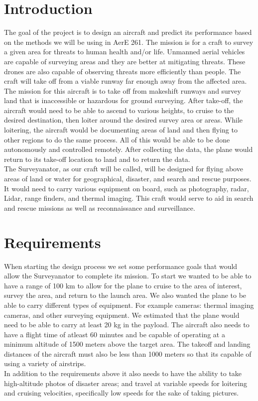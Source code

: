 \documentclass[12pt,A4paper]{article}
\begin{document}
	\section{Introduction}
	\hspace{.15 in} The goal of the project is to design an aircraft and predict its performance based on the methods we will be using in AerE 261. The mission is for a craft to survey a given area for threats to human health and/or life. Unmanned aerial vehicles are capable of surveying areas and they are better at mitigating threats. These drones are also capable of observing threats more efficiently than people. The craft will take off from a viable runway far enough away from the affected area. The mission for this aircraft is to take off from makeshift runways and survey land that is inaccessible or hazardous for ground surveying. After take-off, the aircraft would need to be able to ascend to various heights, to cruise to the desired destination, then loiter around the desired survey area or areas. While loitering, the aircraft would be documenting areas of land and then flying to other regions to do the same process. All of this would be able to be done autonomously and controlled remotely. After collecting the data, the plane would return to its take-off location to land and to return the data. \\
	\indent The Surveyanator, as our craft will be called, will be designed for flying above areas of land or water for geographical, disaster, and search and rescue purposes. It would need to carry various equipment on board, such as photography, radar, Lidar, range finders, and thermal imaging. This craft would serve to aid in search and rescue missions as well as reconnaissance and surveillance.
	

	\clearpage
	\section{Requirements}
	\hspace{.15 in} When starting the design process we set some performance goals that would allow the Surveyanator to complete its mission. To start we wanted to be able to have a range of 100 km to allow for the plane to cruise to the area of interest, survey the area, and return to the launch area. We also wanted the plane to be able to carry different types of equipment. For example cameras: thermal imaging cameras, and other surveying equipment. We estimated that the plane would need to be able to carry at least 20 kg in the payload. The aircraft also needs to have a flight time of atleast 60 minutes and be capable of operating at a minimum altitude of 1500 meters above the target area. The takeoff and landing distances of the aircraft must also be less than 1000 meters so that its capable of using a variety of airstrips. \\
	\indent In addition to the requirements above it also needs to have the ability to take high-altitude photos of disaster areas; and travel at variable speeds for loitering and cruising velocities, specifically low speeds for the sake of taking pictures.
	
\end{document}
